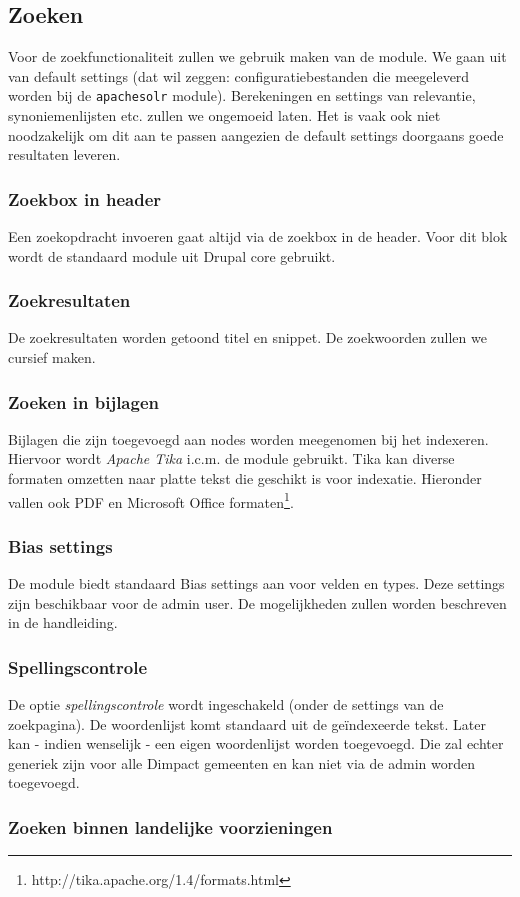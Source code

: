 \subsection{Zoeken}\label{zoeken}
Voor de zoekfunctionaliteit zullen we gebruik maken van de  module. We gaan uit van default settings (dat wil zeggen: configuratiebestanden die meegeleverd worden bij de \texttt{apachesolr} module). Berekeningen en settings van relevantie, synoniemenlijsten etc. zullen we ongemoeid laten. Het is vaak ook niet noodzakelijk om dit aan te passen aangezien de default settings doorgaans goede resultaten leveren.

\subsubsection{Zoekbox in header}
Een zoekopdracht invoeren gaat altijd via de zoekbox in de header. Voor dit blok wordt de standaard  module uit Drupal core gebruikt.

\subsubsection{Zoekresultaten}
De zoekresultaten worden getoond titel en snippet. De zoekwoorden zullen we cursief maken.

\subsubsection{Zoeken in bijlagen}
Bijlagen die zijn toegevoegd aan nodes worden meegenomen bij het indexeren. Hiervoor wordt \emph{Apache Tika} i.c.m. de  module gebruikt. Tika kan diverse formaten omzetten naar platte tekst die geschikt is voor indexatie. Hieronder vallen ook PDF en Microsoft Office formaten\footnote{http://tika.apache.org/1.4/formats.html}.

\subsubsection{Bias settings}
De  module biedt standaard Bias settings aan voor velden en types. Deze settings zijn beschikbaar voor de admin user. De mogelijkheden zullen worden beschreven in de handleiding.

\subsubsection{Spellingscontrole}
De optie \emph{spellingscontrole} wordt ingeschakeld (onder de settings van de zoekpagina). De woordenlijst komt standaard uit de ge\"{i}ndexeerde tekst. Later kan - indien wenselijk - een eigen woordenlijst worden toegevoegd. Die zal echter generiek zijn voor alle Dimpact gemeenten en kan niet via de admin worden toegevoegd.

\subsubsection{Zoeken binnen landelijke voorzieningen}


